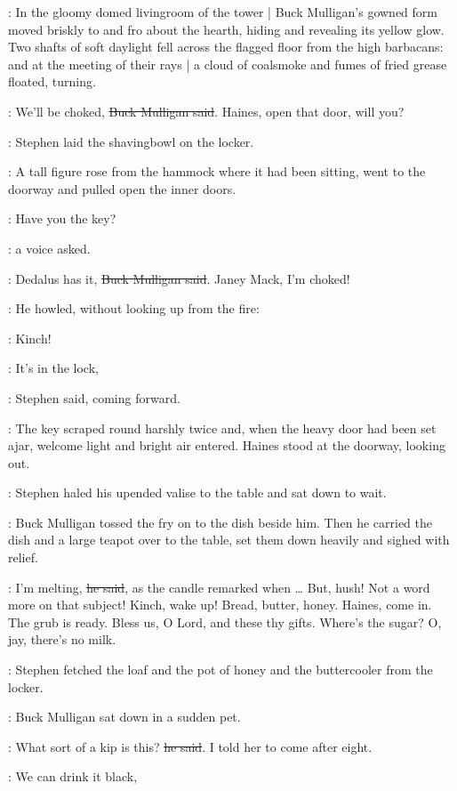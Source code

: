 :
In the gloomy domed livingroom of the tower |
Buck Mulligan's gowned form moved briskly to and fro
about the hearth,
hiding and revealing its yellow glow.
Two shafts of soft daylight
fell across the flagged floor from the high barbacans:
and at the meeting of their rays |
a cloud of coalsmoke and fumes of fried grease floated,
turning.

\Mulligan:
We'll be choked,
\sout{Buck Mulligan said}.
Haines, open that door, will you?

:
Stephen laid the shavingbowl on the locker.

:
A tall figure rose from the hammock where it had been sitting,
went to the doorway
and pulled open the inner doors.

\Haines:
Have you the key?

:
a voice asked.

\Mulligan:
Dedalus has it,
\sout{Buck Mulligan said}.
Janey Mack, I'm choked!

:
He howled, without looking up from the fire:

\Mulligan:
Kinch!

\Stephen:
It's in the lock,

:
Stephen said,
coming forward.

:
The key scraped round harshly twice
and, when the heavy door had been set ajar,
welcome light and bright air entered.
Haines stood at the doorway, looking out.

:
Stephen haled his upended valise to the table and sat down to wait.

:
Buck Mulligan tossed the fry on to the dish beside him.
Then he carried the dish and a large teapot over to the table,
set them down heavily
and sighed with relief.

\Mulligan:
I'm melting,
\sout{he said},
as the candle remarked when …
But, hush!
Not a word more on that subject!
Kinch, wake up!
Bread, butter, honey.
Haines, come in.
The grub is ready.
Bless us, O Lord, and these thy gifts.
Where's the sugar?
O, jay, there's no milk.

:
Stephen fetched the loaf and the pot of honey and the buttercooler
from the locker.

:
Buck Mulligan sat down in a sudden pet.

\Mulligan:
What sort of a kip is this?
\sout{he said}.
I told her to come after eight.

\Stephen:
We can drink it black,


